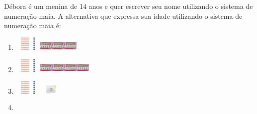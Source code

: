 Débora é um menina de 14 anos e quer escrever seu nome utilizando o
sistema de numeração maia. A alternativa que expressa sua idade
utilizando o sistema de numeração maia é:

\begin{enumerate}
\def\labelenumi{\alph{enumi})}
\item
  \includegraphics[width=0.50004in,height=0.26669in]{media/image14.png}\includegraphics[width=0.25836in,height=0.18335in]{media/image15.png}\includegraphics[width=0.25836in,height=0.18335in]{media/image15.png}\includegraphics[width=0.25836in,height=0.18335in]{media/image15.png}
\item
  \includegraphics[width=0.50004in,height=0.26669in]{media/image14.png}\includegraphics[width=0.25836in,height=0.18335in]{media/image15.png}\includegraphics[width=0.25836in,height=0.18335in]{media/image15.png}\includegraphics[width=0.25836in,height=0.18335in]{media/image15.png}\includegraphics[width=0.25836in,height=0.18335in]{media/image15.png}
\item
  \includegraphics[width=0.50004in,height=0.26669in]{media/image14.png}\includegraphics[width=0.47504in,height=0.18335in]{media/image16.png}
\item

\end{enumerate}
